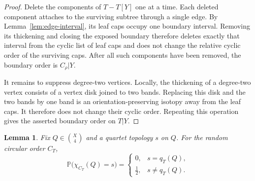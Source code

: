 \documentclass[a4paper]{amsart}
\newtheorem{lemma}[theorem]{Lemma}
\theoremstyle{remark}
\newcommand{\Prb}{\mathbb P}
\begin{document}
\begin{proof}
Delete the components of $T-T[Y]$ one at a time. Each deleted
component attaches to the surviving subtree through a single edge.
By Lemma~\ref{lem:edge-interval}, its leaf caps occupy one boundary
interval. Removing its thickening and closing the exposed boundary
therefore deletes exactly that interval from the cyclic list of leaf
caps and does not change the relative cyclic order of the surviving
caps. After all such components have been removed, the boundary order
is $C_\rho|Y$.

It remains to suppress degree-two vertices. Locally, the thickening
of a degree-two vertex consists of a vertex disk joined to two bands.
Replacing this disk and the two bands by one band is an
orientation-preserving isotopy away from the leaf caps. It therefore
does not change their cyclic order. Repeating this operation gives
the asserted boundary order on $T|Y$.
\end{proof}

\begin{lemma}\label{lem:wrong-channel}
Fix $Q\in\binom X4$ and a quartet topology $s$ on $Q$. For the
random circular order $C_T$,
\[
 \Prb\bigl(\chi_{C_T}(Q)=s\bigr)
 =
 \begin{cases}
  0, & s=q_T(Q),\\[2pt]
  \frac12, & s\ne q_T(Q).
 \end{cases}
\]
\end{lemma}
\end{document}
